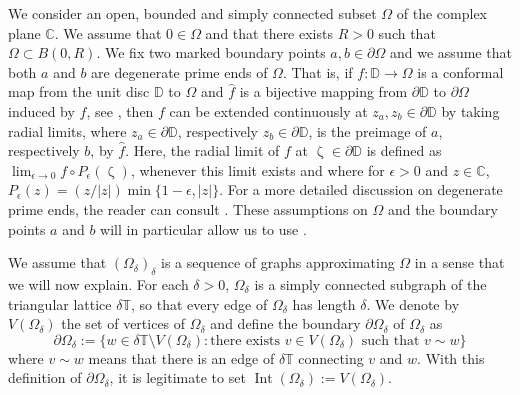 \documentclass{article}
\newcommand{\eps}{{\epsilon}}
\theoremstyle{definition}
\theoremstyle{remark}
\theoremstyle{remark}
\begin{document}
We consider an open, bounded and simply connected subset $\Omega$ of the complex plane $\mathbb{C}$. We assume that $0 \in \Omega$ and that there exists $R>0$ such that $\Omega \subset B(0,R)$. We fix two marked boundary points $a, b \in \partial \Omega$ and we assume that both $a$ and $b$ are degenerate prime ends of $\Omega$. That is, if $f: \mathbb{D} \to \Omega$ is a conformal map from the unit disc $\mathbb{D}$ to $\Omega$ and $\hat f $ is a bijective mapping from $\partial \mathbb{D}$ to $\partial \Omega$ induced by $f$, see \cite[Theorem~2.15]{Pommeranke}, then $f$ can be extended continuously at $z_a, z_b \in \partial \mathbb{D}$ by taking radial limits, where $z_a \in \partial \mathbb{D}$, respectively $z_b \in \partial \mathbb{D}$, is the preimage of $a$, respectively $b$, by $\hat f$. Here, the radial limit of $f$ at $\upzeta \in \partial \mathbb{D}$ is defined as $\lim_{\eps \to 0} f \circ P_{\eps}(\upzeta)$, whenever this limit exists and where for $\eps > 0$ and $z \in \mathbb{C}$, $P_{\eps}(z) = (z / \vert z \vert) \min \{ 1- \eps, \vert z \vert \}$. For a more detailed discussion on degenerate prime ends, the reader can consult \cite[Section~2.5]{Pommeranke}. These assumptions on $\Omega$ and the boundary points $a$ and $b$ will in particular allow us to use \cite[Theorem~4.2]{Karrila}.

We assume that $(\Omega_{\delta})_{\delta}$ is a sequence of graphs approximating $\Omega$ in a sense that we will now explain. For each $\delta > 0$, $\Omega_{\delta}$ is a simply connected subgraph of the triangular lattice $\delta \mathbb{T}$, so that every edge of $\Omega_{\delta}$ has length $\delta$. We denote by $V(\Omega_{\delta})$ the set of vertices of $\Omega_{\delta}$ and define the boundary $\partial \Omega_{\delta}$ of $\Omega_{\delta}$ as
\begin{equation*}
    \partial \Omega_{\delta} := \{ w \in \delta \mathbb{T} \setminus V(\Omega_{\delta}): \text{there exists $v \in V(\Omega_{\delta})$ such that $v \sim w$}\}
\end{equation*}
where $v \sim w$ means that there is an edge of $\delta \mathbb{T}$ connecting $v$ and $w$. With this definition of $\partial \Omega_{\delta}$, it is legitimate to set $\operatorname{Int}(\Omega_{\delta}):=V(\Omega_{\delta})$.
\end{document}
